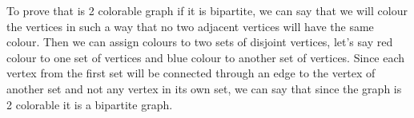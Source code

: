 \documentclass[a4paper]{exam}
\begin{document}
\begin{questions}
\begin{answer}
To prove that is 2 colorable graph if it is bipartite, we can say that we will colour the vertices in such a way that no two adjacent vertices will have the same colour. Then we can assign colours to two sets of disjoint vertices, let's say red colour to one set of vertices and blue colour to another set of vertices. Since each vertex from the first set will be connected through an edge to the vertex of another set and not any vertex in its own set, we can say that since the graph is 2 colorable it is a bipartite graph.
\end{answer}



 

\end{questions}
\end{document}
